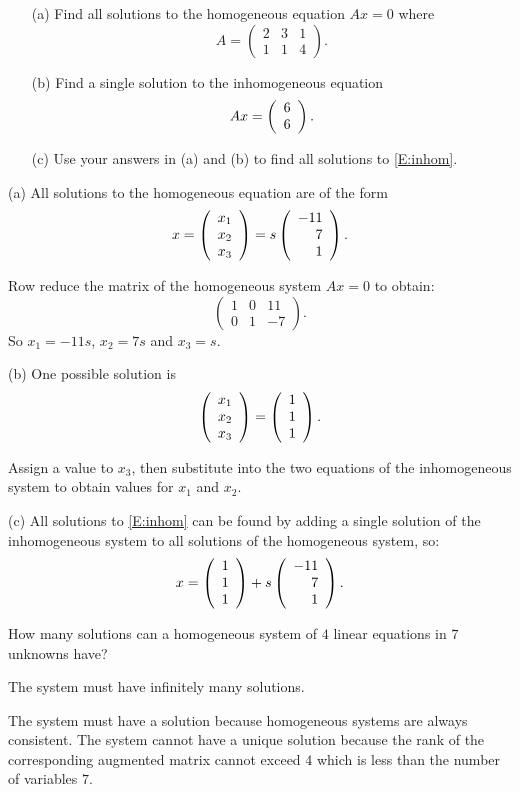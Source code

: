 \documentclass{ximera}
\begin{document}
\begin{exercise} \label{c4.4.3}
\begin{itemize}
\item[(a)] Find all solutions to the homogeneous equation
$Ax=0$ where
\[
A = \left(\begin{array}{ccc} 2 & 3 & 1 \\ 1 & 1 & 4 \end{array}
\right).
\]
\item[(b)] Find a single solution to the inhomogeneous equation
\begin{equation}  \label{E:inhom}
Ax =\left(\begin{array}{r} 6 \\ 6\end{array}\right).
\end{equation}
\item[(c)] Use your answers in (a) and (b) to find all solutions
to \eqref{E:inhom}.
\end{itemize}

\begin{solution}

(a) \ans All solutions to the homogeneous equation are of the form
\[
x = \left(\begin{array}{r} x_1 \\ x_2 \\ x_3\end{array}\right) = s\left(\begin{array}{r} -11 \\ 7 \\ 1\end{array}\right).
\]

\soln Row reduce the matrix of the homogeneous system
$Ax = 0$ to obtain:
\[
\left(\begin{array}{rrr} 1 & 0 & 11 \\ 0 & 1 & -7 \end{array}\right).
\]
So $x_1 = -11s$, $x_2 = 7s$ and $x_3 = s$.

(b) \ans One possible solution is
\[ \left(\begin{array}{r} x_1 \\ x_2 \\ x_3\end{array}\right) = \left(\begin{array}{r} 1 \\ 1 \\ 1\end{array}\right). \]

\soln Assign a value to $x_3$, then substitute into the two equations
of the inhomogeneous system to obtain values for $x_1$ and $x_2$.

(c) All solutions to \eqref{E:inhom} can be found by adding a
single solution of the inhomogeneous system to all solutions
of the homogeneous system, so:
\[
x = \left(\begin{array}{r} 1 \\ 1 \\ 1\end{array}\right) + s\left(\begin{array}{r} -11 \\ 7 \\ 1\end{array}\right).
\]
\end{solution}
\end{exercise}

\AEXER

\begin{exercise} \label{A.3.4.1}
How many solutions can a homogeneous system of $4$ linear equations in $7$ unknowns have?

\begin{solution}
\ans The system must have infinitely many solutions.

The system must have a solution because homogeneous systems are always consistent.
The system cannot have a unique solution because the rank of the corresponding augmented matrix cannot exceed $4$ which is less than the number of variables $7$.
\end{solution}
\end{exercise}
\end{document}
